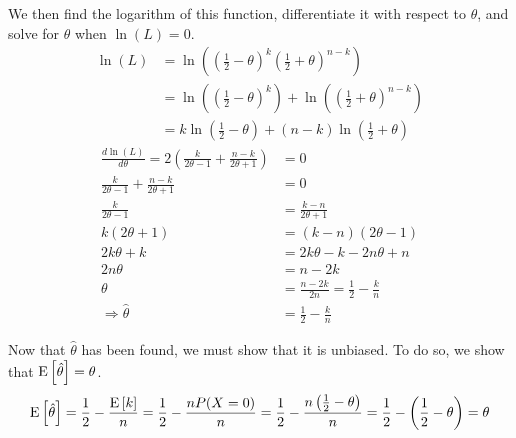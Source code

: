 \documentclass[fleqn]{article}
\begin{document}
\begin{answers}
		We then find the logarithm of this function, differentiate it with respect to \(\theta\), and solve for \(\theta\) when \(\ln(L) = 0\).
		\begin{align*}
			\ln(L) & = \ln \left(\left(\frac{1}{2} - \theta\right)^k \left(\frac{1}{2} + \theta\right)^{n-k}\right) \\
			       & = \ln \left(\left(\frac{1}{2} - \theta\right)^k \right) + \ln \left(\left(\frac{1}{2} + \theta\right)^{n-k}\right) \\
			       & = k \ln \left(\frac{1}{2} - \theta \right) + (n-k) \ln \left(\frac{1}{2} + \theta\right)
		\end{align*}
		\begin{align*}
			\frac{d\ln(L)}{d\theta} = 2\left(\frac{k}{2\theta-1} + \frac{n-k}{2\theta+1}\right) & = 0 \\
			\frac{k}{2\theta-1} + \frac{n-k}{2\theta+1}                                         & = 0 \\
			\frac{k}{2\theta-1}                                                                 & = \frac{k-n}{2\theta+1} \\
			k(2\theta+1)                                                                        & = (k-n)(2\theta-1) \\
			2k\theta+k                                                                          & = 2k\theta - k - 2n\theta + n \\
			2n\theta                                                                            & = n - 2k \\
			\theta                                                                              & = \frac{n - 2k}{2n} = \frac{1}{2} - \frac{k}{n} \\
			\Rightarrow \hat{\theta}                                                            & = \frac{1}{2} - \frac{k}{n}
		\end{align*}

		Now that \(\hat\theta\) has been found, we must show that it is unbiased. To do so, we show that \(\operatorname{E}\left[\hat{\theta}\right] = \theta\).
		\[
			\operatorname{E}\left[\hat{\theta}\right] = \frac{1}{2} - \frac{\operatorname{E}\left[k\right]}{n} = \frac{1}{2} - \frac{n P(X = 0)}{n} = \frac{1}{2} - \frac{n \left( \frac{1}{2} - \theta \right)}{n} = \frac{1}{2} - \left( \frac{1}{2} - \theta \right) = \theta
		\]

\end{answers}
\end{document}
